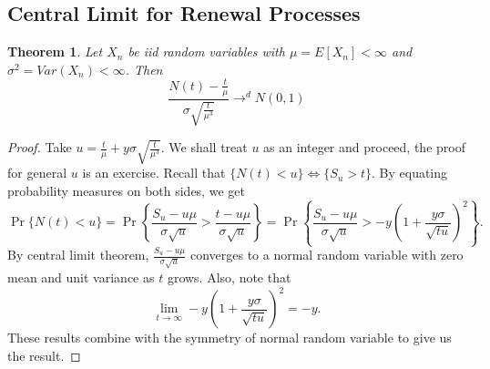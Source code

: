 \documentclass[a4paper,10pt]{article}
\theoremstyle{plain}
\newtheorem{thm}{Theorem}[section]
\theoremstyle{definition}
\begin{document}
\subsection{Central Limit for Renewal Processes}
\begin{thm}
Let $X_n$ be \emph{iid} random variables with $\mu = E[X_n] < \infty$ and $\sigma^2 = Var(X_n) < \infty$. Then
\[\frac{N(t)-\frac{t}{\mu}}{\sigma \sqrt{\frac{t}{\mu^3}}} \to^d N(0,1) \]
\end{thm}
\begin{proof}
Take $u = \frac{t}{\mu} + y \sigma \sqrt{\frac{t}{\mu^3}}$. We shall treat $u$ as an integer and proceed, the proof for general $u$ is an exercise. Recall that $\{N(t) < u\} \iff \{S_u > t\}$. By equating probability measures on both sides, we get
\begin{equation*}
\Pr\{N(t) < u\} = \Pr\left\{\frac{S_u - u\mu}{\sigma \sqrt{u}} > \frac{t - u\mu}{\sigma \sqrt{u}}\right\} = \Pr\left\{\frac{S_u - u\mu}{\sigma \sqrt{u}} > -y\left(1 + \frac{y\sigma}{\sqrt{tu}}\right)^2\right\}.
\end{equation*}
By central limit theorem, $\frac{S_u - u\mu}{\sigma \sqrt{u}}$ converges to a normal random variable with zero mean and unit variance as $t$ grows. Also, note that 
\begin{equation*}
\lim_{t \to \infty} -y\left(1 + \frac{y\sigma}{\sqrt{tu}}\right)^2 = -y.
\end{equation*}
These results combine with the symmetry of normal random variable to give us the result.
\end{proof}
\end{document}
